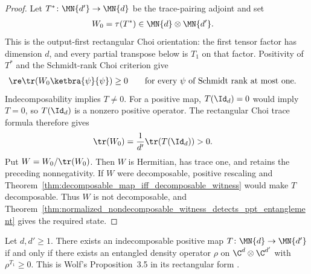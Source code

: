 \begin{proof}
    \leanok
    Let $T^*\colon\MN{d'}\to\MN{d}$ be the trace-pairing adjoint and set
    \begin{align}
        W_0&=\tau(T^*)\in\MN{d}\otimes\MN{d'}.
        \notag
    \end{align}
    This is the output-first rectangular Choi orientation: the first tensor
    factor has dimension $d$, and every partial transpose below is $T_1$ on
    that factor. Positivity of $T^*$ and the Schmidt-rank Choi criterion give
    \begin{align}
        \re\tr\!\left(W_0\ketbra{\psi}{\psi}\right)&\geq0
        \qquad\text{for every $\psi$ of Schmidt rank at most one}.
        \notag
    \end{align}
    Indecomposability implies $T\neq0$. For a positive map,
    $T(\Id_d)=0$ would imply $T=0$, so $T(\Id_d)$ is a nonzero positive
    operator. The rectangular Choi trace formula therefore gives
    \begin{align}
        \tr(W_0)&=\frac{1}{d'}\tr\!\left(T(\Id_d)\right)>0.
        \notag
    \end{align}
    Put $W=W_0/\tr(W_0)$. Then $W$ is Hermitian, has trace one, and retains
    the preceding nonnegativity. If $W$ were decomposable, positive rescaling
    and Theorem~\ref{thm:decomposable_map_iff_decomposable_witness} would make
    $T$ decomposable. Thus $W$ is not decomposable, and
    Theorem~\ref{thm:normalized_nondecomposable_witness_detects_ppt_entanglement}
    gives the required state.
\end{proof}

\begin{theorem}
    \label{thm:ppt_indecomposable_equivalence}
    \leanok
    Let $d,d'\geq1$. There exists an indecomposable positive map
    $T\colon\MN{d}\to\MN{d'}$ if and only if there exists an entangled
    density operator $\rho$ on $\C^d\otimes\C^{d'}$ with
    $\rho^{T_1}\geq0$. This is Wolf's Proposition~3.5 in its rectangular
    form \cite[Chapter~3, Proposition~3.5]{Wolf2012Quantum}.
\end{theorem}

